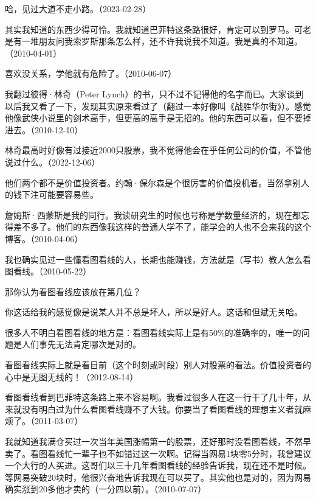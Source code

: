 
哈，见过大道不走小路。（2023-02-28）

其实我知道的东西少得可怜。我就知道巴菲特这条路很好，肯定可以到罗马。可老是有一堆朋友问我索罗斯那条怎么样，还不许我说我不知道。我是真的不知道。（2010-04-01）


喜欢没关系，学他就有危险了。（2010-06-07）

我翻过彼得·林奇（Peter Lynch）的书，只不过不记得他的名字而已。大家谈到以后我又看了一下，发现其实原来看过了（翻过一本好像叫《战胜华尔街》）。感觉他像武侠小说里的剑术高手，但更高的高手是无招的。他的东西可以看，但不要掉进去。（2010-12-10）

林奇最高时好像有过接近2000只股票，我不觉得他会在乎任何公司的价值，不管他说过什么。（2022-12-06）


他们两个都不是价值投资者。约翰·保尔森是个很厉害的价值投机者。当然拿别人的钱下注可能要容易些。

詹姆斯·西蒙斯是我的同行。我读研究生的时候也号称是学数量经济的，现在都忘得差不多了。他们的东西像我这样的普通人学不了，能学会的人也不会来我的这个博客。（2010-04-06）

我也确实见过一些懂看图看线的人，长期也能赚钱，方法就是（写书）教人怎么看图看线。（2010-05-22）


那你认为看图看线应该放在第几位？

你这话给我的感觉像是说某人并不总是坏人，所以是好人。这话和但斌无关哈。

很多人不明白看图看线的地方是：看图看线实际上是有50\%的准确率的，唯一的问题是人们事先无法肯定哪次是对的。

看图看线实际上就是看目前（这个时刻或时段）别人对股票的看法。价值投资者的心中是无图无线的！（2012-08-14）

看图看线看到巴菲特这条路上来不容易啊。我看过很多人在这一行干了几十年，从来就没有明白过为什么看图看线赚不了大钱。你要当了看图看线的理想主义者就麻烦了。（2011-03-07）

我就知道我满仓买过一次当年美国涨幅第一的股票，还好那时没看图看线，不然早卖了。看图看线忙一辈子也不如错过这一次啊。记得当网易1块零5分时，我曾建议一个大行的人买进。这哥们以三十几年看图看线的经验告诉我，现在还不是时候。等网易突破20块时，他很兴奋地告诉我现在可以买了。其实他也是对的，因为网易确实涨到20多他才卖的（一分四以前）。（2010-07-07）

